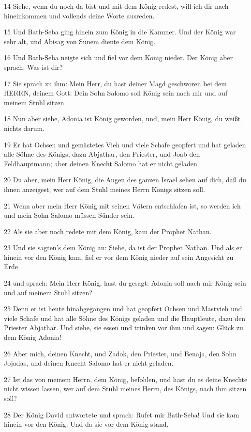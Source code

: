 \par 14 Siehe, wenn du noch da bist und mit dem König redest, will ich dir nach hineinkommen und vollends deine Worte ausreden.
\par 15 Und Bath-Seba ging hinein zum König in die Kammer. Und der König war sehr alt, und Abisag von Sunem diente dem König.
\par 16 Und Bath-Seba neigte sich und fiel vor dem König nieder. Der König aber sprach: Was ist dir?
\par 17 Sie sprach zu ihm: Mein Herr, du hast deiner Magd geschworen bei dem HERRN, deinem Gott: Dein Sohn Salomo soll König sein nach mir und auf meinem Stuhl sitzen.
\par 18 Nun aber siehe, Adonia ist König geworden, und, mein Herr König, du weißt nichts darum.
\par 19 Er hat Ochsen und gemästetes Vieh und viele Schafe geopfert und hat geladen alle Söhne des Königs, dazu Abjathar, den Priester, und Joab den Feldhauptmann; aber deinen Knecht Salomo hat er nicht geladen.
\par 20 Du aber, mein Herr König, die Augen des ganzen Israel sehen auf dich, daß du ihnen anzeigest, wer auf dem Stuhl meines Herrn Königs sitzen soll.
\par 21 Wenn aber mein Herr König mit seinen Vätern entschlafen ist, so werden ich und mein Sohn Salomo müssen Sünder sein.
\par 22 Als sie aber noch redete mit dem König, kam der Prophet Nathan.
\par 23 Und sie sagten's dem König an: Siehe, da ist der Prophet Nathan. Und als er hinein vor den König kam, fiel er vor dem König nieder auf sein Angesicht zu Erde
\par 24 und sprach: Mein Herr König, hast du gesagt: Adonia soll nach mir König sein und auf meinem Stuhl sitzen?
\par 25 Denn er ist heute hinabgegangen und hat geopfert Ochsen und Mastvieh und viele Schafe und hat alle Söhne des Königs geladen und die Hauptleute, dazu den Priester Abjathar. Und siehe, sie essen und trinken vor ihm und sagen: Glück zu dem König Adonia!
\par 26 Aber mich, deinen Knecht, und Zadok, den Priester, und Benaja, den Sohn Jojadas, und deinen Knecht Salomo hat er nicht geladen.
\par 27 Ist das von meinem Herrn, dem König, befohlen, und hast du es deine Knechte nicht wissen lassen, wer auf dem Stuhl meines Herrn, des Königs, nach ihm sitzen soll?
\par 28 Der König David antwortete und sprach: Rufet mir Bath-Seba! Und sie kam hinein vor den König. Und da sie vor dem König stand,
